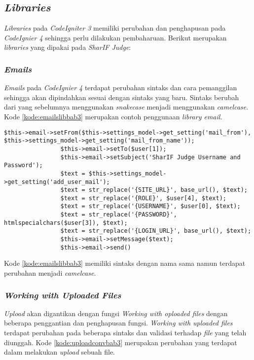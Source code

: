 \subsection{\textit{Libraries}}
\textit{Libraries} pada \textit{CodeIgniter 3} memiliki perubahan dan penghapusan pada \textit{CodeIgnier 4} sehingga perlu dilakukan pembaharuan. Berikut merupakan \textit{libraries} yang dipakai pada \textit{SharIF Judge}:

\subsubsection{\textit{Emails}}
\textit{Emails} pada \textit{CodeIgnier 4} terdapat perubahan sintaks dan cara pemanggilan sehingga akan dipindahkan sesuai dengan sintaks yang baru. Sintaks berubah dari yang sebelumnya menggunakan \textit{snakecase} menjadi menggunakan \textit{camelcase}. Kode \ref{kode:emailslibbab3} merupakan contoh penggunaan \textit{library email}.

\begin{lstlisting}[caption=Contoh perubahan \textit{library emails}, label=kode:emailslibbab3]
$this->email->setFrom($this->settings_model->get_setting('mail_from'), $this->settings_model->get_setting('mail_from_name'));
				$this->email->setTo($user[1]);
				$this->email->setSubject('SharIF Judge Username and Password');
				$text = $this->settings_model->get_setting('add_user_mail');
				$text = str_replace('{SITE_URL}', base_url(), $text);
				$text = str_replace('{ROLE}', $user[4], $text);
				$text = str_replace('{USERNAME}', $user[0], $text);
				$text = str_replace('{PASSWORD}', htmlspecialchars($user[3]), $text);
				$text = str_replace('{LOGIN_URL}', base_url(), $text);
				$this->email->setMessage($text);
				$this->email->send()
\end{lstlisting}

Kode \ref{kode:emailslibbab3} memiliki sintaks dengan nama sama namun terdapat perubahan menjadi \textit{camelcase}.

\subsubsection{\textit{Working with Uploaded Files}}
\textit{Upload} akan digantikan dengan fungsi \textit{Working with oploaded files} dengan beberapa penggantian dan penghapusan fungsi. \textit{Working with uploaded files} terdapat perubahan pada beberapa sintaks dan validasi terhadap \textit{file} yang telah diunggah. Kode \ref{kode:uploadconvbab3} merupakan perubahan yang terdapat dalam melakukan \textit{upload} sebuah file.

